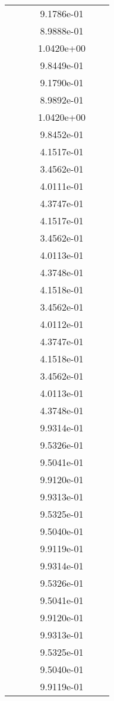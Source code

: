 \begin{xltabular}{\textwidth}{r|rS[table-format=1.3e+2]S[table-format=1.4e+2]S[table-format=1.4e+2]S[table-format=-1.5]}
&  &  & 9.1786e-01 & & \\
&  &  & 8.9888e-01 & & \\
&  &  & 1.0420e+00 & & \\
&  &  & 9.8449e-01 & & \\
&  &  & 9.1790e-01 & & \\
&  &  & 8.9892e-01 & & \\
&  &  & 1.0420e+00 & & \\
&  &  & 9.8452e-01 & & \\
&  &  & 4.1517e-01 & & \\
&  &  & 3.4562e-01 & & \\
&  &  & 4.0111e-01 & & \\
&  &  & 4.3747e-01 & & \\
&  &  & 4.1517e-01 & & \\
&  &  & 3.4562e-01 & & \\
&  &  & 4.0113e-01 & & \\
&  &  & 4.3748e-01 & & \\
&  &  & 4.1518e-01 & & \\
&  &  & 3.4562e-01 & & \\
&  &  & 4.0112e-01 & & \\
&  &  & 4.3747e-01 & & \\
&  &  & 4.1518e-01 & & \\
&  &  & 3.4562e-01 & & \\
&  &  & 4.0113e-01 & & \\
&  &  & 4.3748e-01 & & \\
&  &  & 9.9314e-01 & & \\
&  &  & 9.5326e-01 & & \\
&  &  & 9.5041e-01 & & \\
&  &  & 9.9120e-01 & & \\
&  &  & 9.9313e-01 & & \\
&  &  & 9.5325e-01 & & \\
&  &  & 9.5040e-01 & & \\
&  &  & 9.9119e-01 & & \\
&  &  & 9.9314e-01 & & \\
&  &  & 9.5326e-01 & & \\
&  &  & 9.5041e-01 & & \\
&  &  & 9.9120e-01 & & \\
&  &  & 9.9313e-01 & & \\
&  &  & 9.5325e-01 & & \\
&  &  & 9.5040e-01 & & \\
&  &  & 9.9119e-01 & & \\

\end{xltabular}
